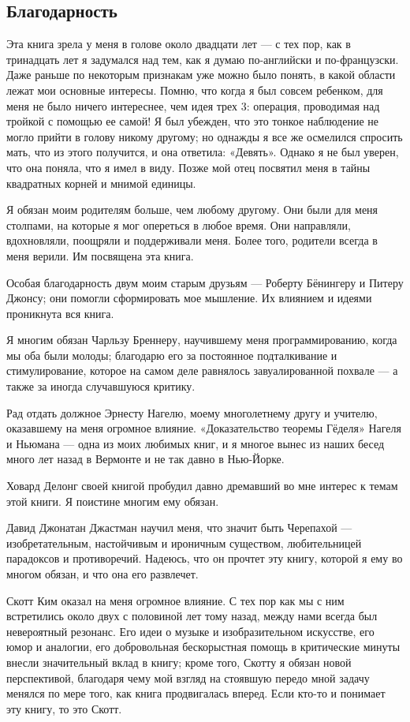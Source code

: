 \subsection{Благодарность}

Эта книга зрела у меня в голове около двадцати лет --- с тех пор, как в тринадцать лет я задумался над тем, как я думаю по-английски и по-французски. Даже раньше по некоторым признакам уже можно было понять, в какой области лежат мои основные интересы. Помню, что когда я был совсем ребенком, для меня не было ничего интереснее, чем идея трех 3: операция, проводимая над тройкой с помощью ее самой! Я был убежден, что это тонкое наблюдение не могло прийти в голову никому другому; но однажды я все же осмелился спросить мать, что из этого получится, и она ответила: «Девять». Однако я не был уверен, что она поняла, что я имел в виду. Позже мой отец посвятил меня в тайны квадратных корней и мнимой единицы.

Я обязан моим родителям больше, чем любому другому. Они были для меня столпами, на которые я мог опереться в любое время. Они направляли, вдохновляли, поощряли и поддерживали меня. Более того, родители всегда в меня верили. Им посвящена эта книга.

Особая благодарность двум моим старым друзьям --- Роберту Бёнингеру и Питеру Джонсу; они помогли сформировать мое мышление. Их влиянием и идеями проникнута вся книга.

Я многим обязан Чарльзу Бреннеру, научившему меня программированию, когда мы оба были молоды; благодарю его за постоянное подталкивание и стимулирование, которое на самом деле равнялось завуалированной похвале --- а также за иногда случавшуюся критику.

Рад отдать должное Эрнесту Нагелю, моему многолетнему другу и учителю, оказавшему на меня огромное влияние. «Доказательство теоремы Гёделя» Нагеля и Ньюмана --- одна из моих любимых книг, и я многое вынес из наших бесед много лет назад в Вермонте и не так давно в Нью-Йорке.

Ховард Делонг своей книгой пробудил давно дремавший во мне интерес к темам этой книги. Я поистине многим ему обязан.

Давид Джонатан Джастман научил меня, что значит быть Черепахой --- изобретательным, настойчивым и ироничным существом, любительницей парадоксов и противоречий. Надеюсь, что он прочтет эту книгу, которой я ему во многом обязан, и что она его развлечет.

Скотт Ким оказал на меня огромное влияние. С тех пор как мы с ним встретились около двух с половиной лет тому назад, между нами всегда был невероятный резонанс. Его идеи о музыке и изобразительном искусстве, его юмор и аналогии, его добровольная бескорыстная помощь в критические минуты внесли значительный вклад в книгу; кроме того, Скотту я обязан новой перспективой, благодаря чему мой взгляд на стоявшую передо мной задачу менялся по мере того, как книга продвигалась вперед. Если кто-то и понимает эту книгу, то это Скотт.

